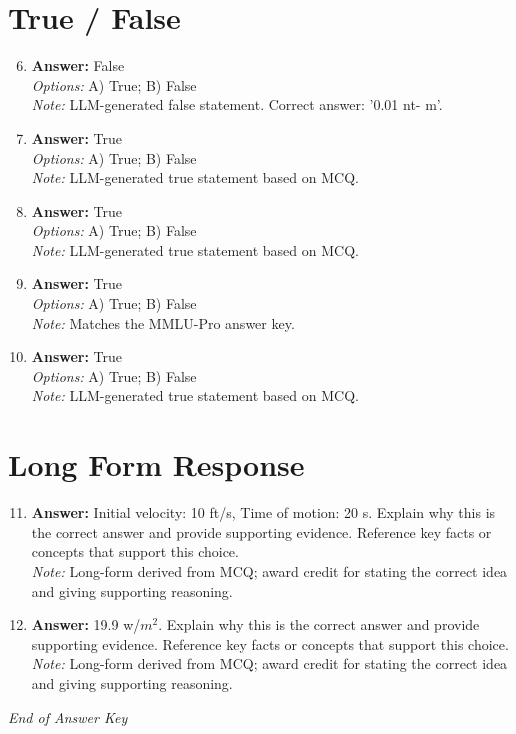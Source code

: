 \documentclass[12pt]{article}
\begin{document}
\section*{True / False}
\begin{enumerate}[label=\arabic*.]
\setcounter{enumi}{5}
\item \textbf{Answer:} False
\\ \textit{Options:} A) True; B) False
\\ \textit{Note:} LLM-generated false statement. Correct answer: '0.01 nt- m'.
\item \textbf{Answer:} True
\\ \textit{Options:} A) True; B) False
\\ \textit{Note:} LLM-generated true statement based on MCQ.
\item \textbf{Answer:} True
\\ \textit{Options:} A) True; B) False
\\ \textit{Note:} LLM-generated true statement based on MCQ.
\item \textbf{Answer:} True
\\ \textit{Options:} A) True; B) False
\\ \textit{Note:} Matches the MMLU-Pro answer key.
\item \textbf{Answer:} True
\\ \textit{Options:} A) True; B) False
\\ \textit{Note:} LLM-generated true statement based on MCQ.
\end{enumerate}

\section*{Long Form Response}
\begin{enumerate}[label=\arabic*.]
\setcounter{enumi}{10}
\item \textbf{Answer:} Initial velocity: 10 ft/s, Time of motion: 20 s. Explain why this is the correct answer and provide supporting evidence. Reference key facts or concepts that support this choice.
\\ \textit{Note:} Long-form derived from MCQ; award credit for stating the correct idea and giving supporting reasoning.
\item \textbf{Answer:} 19.9 w/$m^2$. Explain why this is the correct answer and provide supporting evidence. Reference key facts or concepts that support this choice.
\\ \textit{Note:} Long-form derived from MCQ; award credit for stating the correct idea and giving supporting reasoning.
\end{enumerate}

\vfill
\noindent\textit{End of Answer Key}
\end{document}

